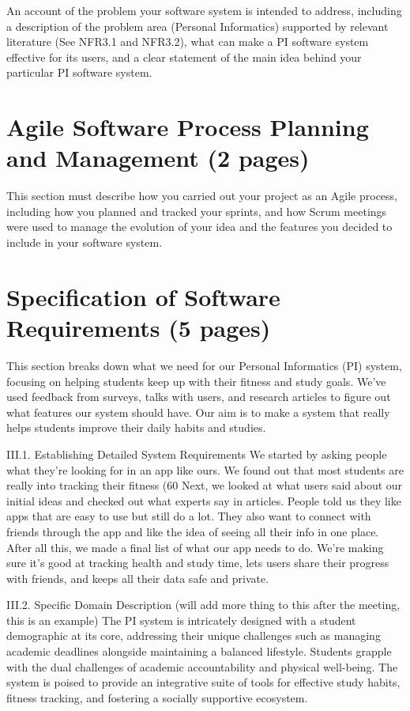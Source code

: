 \documentclass[12pt]{article}
\begin{document}
An account of the problem your software system is intended to address, including a
description of the problem area (Personal Informatics) supported by relevant literature (See
NFR3.1 and NFR3.2), what can make a PI software system effective for its users, and a clear
statement of the main idea behind your particular PI software system.


\section{Agile Software Process Planning and Management (2 pages)}

This section must describe how you carried out your project as an Agile process, including
how you planned and tracked your sprints, and how Scrum meetings were used to manage
the evolution of your idea and the features you decided to include in your software system.


\section{Specification of Software Requirements (5 pages)}

This section breaks down what we need for our Personal Informatics (PI) system, focusing on helping students keep up with their fitness and study goals. We've used feedback from surveys, talks with users, and research articles to figure out what features our system should have. Our aim is to make a system that really helps students improve their daily habits and studies.

III.1. Establishing Detailed System Requirements
We started by asking people what they're looking for in an app like ours. We found out that most students are really into tracking their fitness (60%
Next, we looked at what users said about our initial ideas and checked out what experts say in articles. People told us they like apps that are easy to use but still do a lot. They also want to connect with friends through the app and like the idea of seeing all their info in one place.
After all this, we made a final list of what our app needs to do. We're making sure it's good at tracking health and study time, lets users share their progress with friends, and keeps all their data safe and private.
 
III.2. Specific Domain Description (will add more thing to this after the meeting, this is an example)
The PI system is intricately designed with a student demographic at its core, addressing their unique challenges such as managing academic deadlines alongside maintaining a balanced lifestyle.
Students grapple with the dual challenges of academic accountability and physical well-being. The system is poised to provide an integrative suite of tools for effective study habits, fitness tracking, and fostering a socially supportive ecosystem.
 
\end{document}
